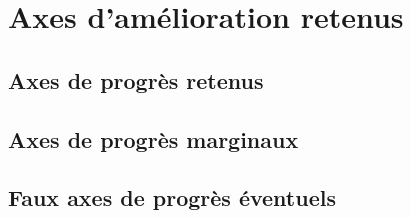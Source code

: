 \section{Axes d'amélioration retenus}

\subsection{Axes de progrès retenus}

\subsection{Axes de progrès marginaux}

\subsection{Faux axes de progrès éventuels}
